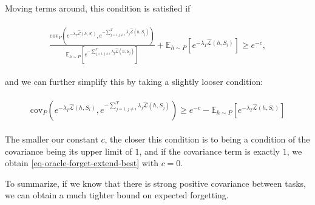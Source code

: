 \documentclass[letterpaper]{article}
\theoremstyle{definition}
\begin{document}
Moving terms around, this condition is satisfied if

\begin{align*} 
\begin{split}
\frac{\mathrm{cov}_{P}(e^{-\lambda_T\hat{\mathcal{L}}(h,S_i)}, e^{-\sum_{j=1,j\neq i}^{T}\lambda_j\hat{\mathcal{L}}(h,S_j)})}{\mathbb{E}_{h\sim P}\left [e^{-\sum_{j=1,j\neq i}^{T}\lambda_j\hat{\mathcal{L}}(h,S_j)} \right ]}+\mathbb{E}_{h\sim P}\left [e^{-\lambda_T\hat{\mathcal{L}}(h,S_i)} \right ]
 \geq e^{-c},
\end{split}
\end{align*}

and we can further simplify this by taking a slightly looser condition:

\begin{align*} 
\begin{split}
\mathrm{cov}_{P}(e^{-\lambda_T\hat{\mathcal{L}}(h,S_i)}, e^{-\sum_{j=1,j\neq i}^{T}\lambda_j\hat{\mathcal{L}}(h,S_j)})
 \geq e^{-c}-\mathbb{E}_{h\sim P}\left [e^{-\lambda_T\hat{\mathcal{L}}(h,S_i)} \right ]
\end{split}
\end{align*}

The smaller our constant $c$, the closer this condition is to being a condition of the covariance being its upper limit of $1$, and if the covariance term is exactly $1$, we obtain \eqref{eq-oracle-forget-extend-best} with $c=0$.

To summarize, if we know that there is strong positive covariance between tasks, we can obtain a much tighter bound on expected forgetting.
\end{document}
